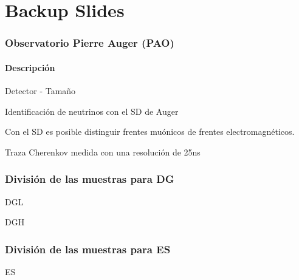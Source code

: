 \section{Backup Slides}

\frame{\sectionpage}

	
\begin{frame}
\frametitle{Observatorio Pierre Auger (PAO)}
\framesubtitle{Descripci\'on}
	\begin{block}{Detector - Tama\~no}
		\begin{center}
		\end{center}
	\end{block}
\end{frame}

\begin{frame}{Identificaci\'on de neutrinos con el SD de Auger}
	\begin{alertblock}{}\centering
	Con el SD es posible distinguir frentes mu\'onicos de frentes electromagn\'eticos.
	\end{alertblock}
	
	\begin{block}{Traza Cherenkov medida con una resoluci\'on de 25ns}
	\centering
	\end{block}
	
\end{frame}

\begin{frame}
 \frametitle{Divisi\'on de las muestras para DG}
	\begin{block}{DGL}
		\begin{center}
		\end{center}
	\end{block}
	\begin{block}{DGH}
		\begin{center}
		\end{center}
	\end{block}
\end{frame}

\begin{frame}
 \frametitle{Divisi\'on de las muestras para ES}
	\begin{block}{ES}
		\begin{center}	 
		\end{center}
	\end{block}
\end{frame}


